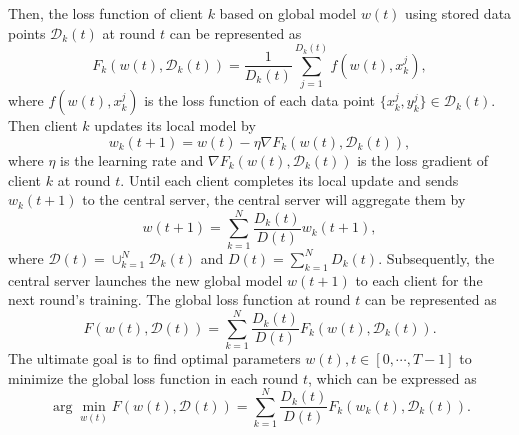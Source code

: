 \documentclass{article}
\theoremstyle{plain}
\theoremstyle{definition}
\theoremstyle{remark}
\begin{document}
Then, the loss function of client $k$ based on global model $w(t)$ using stored data points $\mathcal{D}_k(t)$ at round $t$ can be represented as 
\begin{equation}
  F_k(w(t), \mathcal{D}_k(t)) = \frac{1}{D_k(t)} \sum_{j=1}^{D_k(t)} f(w(t), x_k^j),
\end{equation}
where $f(w(t), x_k^j)$ is the loss function of each data point $\{x_k^j, y_k^j\} \in \mathcal{D}_k(t)$.
Then client $k$ updates its local model by
\begin{equation}
  w_k(t+1) = w(t) - \eta \nabla F_k(w(t), \mathcal{D}_k(t)),
\end{equation}
where $\eta$ is the learning rate and $\nabla F_k(w(t), \mathcal{D}_k(t))$ is the loss gradient of client $k$ at round $t$. 
Until each client completes its local update and sends $w_k(t+1)$ to the central server, the central server will aggregate them by
\begin{equation}
  w(t+1) = \sum_{k=1}^{N} \frac{D_k(t)}{D(t)} w_k(t+1),
\end{equation}
where $\mathcal{D}(t) = \cup_{k=1}^N \mathcal{D}_k(t)$ and $D(t) = \sum_{k=1}^{N} D_k(t)$.
Subsequently, the central server launches the new global model $w(t+1)$ to each client for the next round's training.
The global loss function at round $t$ can be represented as
\begin{equation}
  F(w(t), \mathcal{D}(t)) = \sum_{k=1}^{N} \frac{D_k(t)}{D(t)} F_k(w(t), \mathcal{D}_k(t)).
\end{equation}
The ultimate goal is to find optimal parameters $w(t), t \in [0, \cdots, T-1]$ to minimize the global loss function in each round $t$, which can be expressed as
\begin{equation}
  \arg \min_{w(t)} F(w(t), \mathcal{D}(t)) = \sum_{k=1}^{N} \frac{D_k(t)}{D(t)} F_k(w_k(t), \mathcal{D}_k(t)).
\end{equation}
\end{document}
